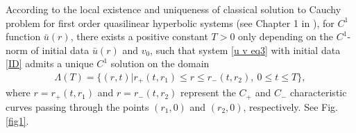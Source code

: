 \documentclass[10pt,leqno]{amsart}
\numberwithin{equation}{section}
\begin{document}
According to the local existence and uniqueness of classical solution to Cauchy problem for first order quasilinear hyperbolic systems (see Chapter 1 in \cite{LiYu85}), for $C^1$ function $\bar{u}(r)$, there exists a positive constant $T > 0$ only depending on the $C^1$-norm of initial data $\bar{u}(r)$ and $v_0$, such that system \eqref{u v eq3} with initial data \eqref{ID} admits a unique $C^1$ solution on the domain 
\begin{equation} \label{def of Lambda}
	\begin{aligned}
		\Lambda (T) = \{ (r,t)|r_{+}(t,r_{1}) \leq r \leq r_{-}(t,r_{2}), \ 0\leq t \leq T  \},
	\end{aligned}
\end{equation}	
where $r=r_{+}(t,r_{1})$ and $r = r_{-}(t,r_{2})$ represent the $C_{+}$ and $C_{-}$ characteristic curves passing through the points $(r_{1},0)$ and $(r_{2},0)$, respectively. See Fig. \ref{fig1}. 
\end{document}
